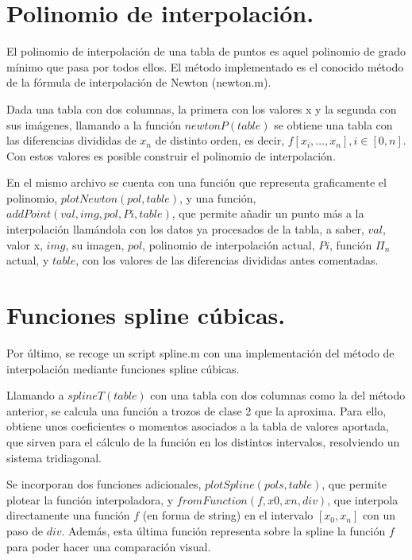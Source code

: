 \documentclass[spanish, a4paper, 12pt] {article}
\begin{document}
\section*{Polinomio de interpolación.}
El polinomio de interpolación de una tabla de puntos es aquel polinomio de grado mínimo que pasa por todos ellos. El método implementado es el conocido método de la fórmula de interpolación de Newton (newton.m).\\ \par
Dada una tabla con dos columnas, la primera con los valores x y la segunda con sus imágenes, llamando a la función $newtonP(table)$ se obtiene una tabla con las diferencias divididas de $x_n$ de distinto orden, es decir, $f[x_i, \ldots, x_n], i\in[0, n]$. Con estos valores es posible construir el polinomio de interpolación.\\ \par
En el mismo archivo se cuenta con una función que representa graficamente el polinomio, $plotNewton(pol, table)$, y una función, $addPoint(val, img, pol, Pi, table)$, que permite añadir un punto más a la interpolación llamándola con los datos ya procesados de la tabla, a saber, $val$, valor x, $img$, su imagen, $pol$, polinomio de interpolación actual, $Pi$, función $\Pi_n$ actual, y $table$, con los valores de las diferencias divididas antes comentadas.
\section*{Funciones spline cúbicas.}
Por último, se recoge un script spline.m con una implementación del método de interpolación mediante funciones spline cúbicas.\\ \par
Llamando a $splineT(table)$ con una tabla con dos columnas como la del método anterior, se calcula una función a trozos de clase 2 que la aproxima. Para ello, obtiene unos coeficientes o momentos asociados a la tabla de valores aportada, que sirven para el cálculo de la función en los distintos intervalos, resolviendo un sistema tridiagonal.\\ \par
Se incorporan dos funciones adicionales, $plotSpline(pols, table)$, que permite plotear la función interpoladora, y $fromFunction(f, x0, xn, div)$, que interpola directamente una función $f$ (en forma de string) en el intervalo $[x_0, x_n]$ con un paso de $div$. Además, esta última función representa sobre la spline la función $f$ para poder hacer una comparación visual.
\end{document}
